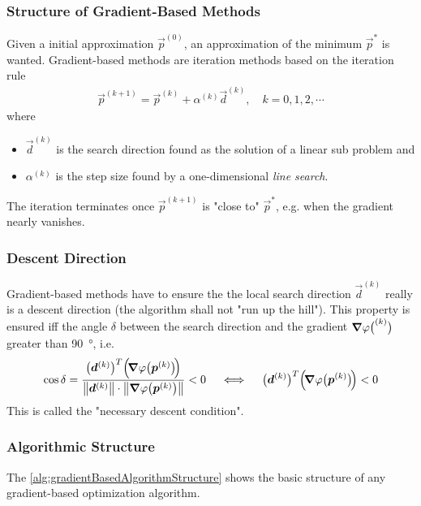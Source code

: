 			\subsubsection{Structure of Gradient-Based Methods}
				Given a initial approximation \( \vec{p}^{(0)} \), an approximation of the minimum \( \vec{p}^\ast \) is wanted. Gradient-based methods are iteration methods based on the iteration rule
				\begin{align*}
					\vec{p}^{(k + 1)} = \vec{p}^{(k)} + \alpha^{(k)} \vec{d}^{(k)},\quad k = 0, 1, 2, \cdots
				\end{align*}
				where
				\begin{itemize}
					\item \(\vec{d}^{(k)}\) is the search direction found as the solution of a linear sub problem and
					\item \(\alpha^{(k)}\) is the step size found by a one-dimensional \emph{line search}.
				\end{itemize}
				The iteration terminates once \( \vec{p}^{(k + 1)} \) is "close to" \(\vec{p}^\ast\), e.g. when the gradient nearly vanishes.

			\subsubsection{Descent Direction}
				Gradient-based methods have to ensure the the local search direction \(\vec{d}^{(k)}\) really is a descent direction (the algorithm shall not "run up the hill"). This property is ensured iff the angle \( \delta \) between the search direction and the gradient \( \grad{\varphi}\big(\bm{}^{(k)}\big) \) greater than \SI{90}{\degree}, i.e.
				\begin{align}
					\cos \delta = \frac{\big( \bm{d}^{(k)} \big)^T \Big(\!\grad{\varphi}\big(\bm{p}^{(k)}\big) \!\Big)}{\big\lVert \bm{d}^{(k)} \big\rVert \cdot \big\lVert \grad{\varphi}\big(\bm{p}^{(k)}\big) \big\rVert} < 0 \quad\iff\quad \big( \bm{d}^{(k)} \big)^T \Big(\! \grad{\varphi}\big(\bm{p}^{(k)}\big) \!\Big) < 0  \label{eq:descentDirection}
				\end{align}
				This is called the "necessary descent condition".

			\subsubsection{Algorithmic Structure}
				The \autoref{alg:gradientBasedAlgorithmStructure} shows the basic structure of any gradient-based optimization algorithm.

